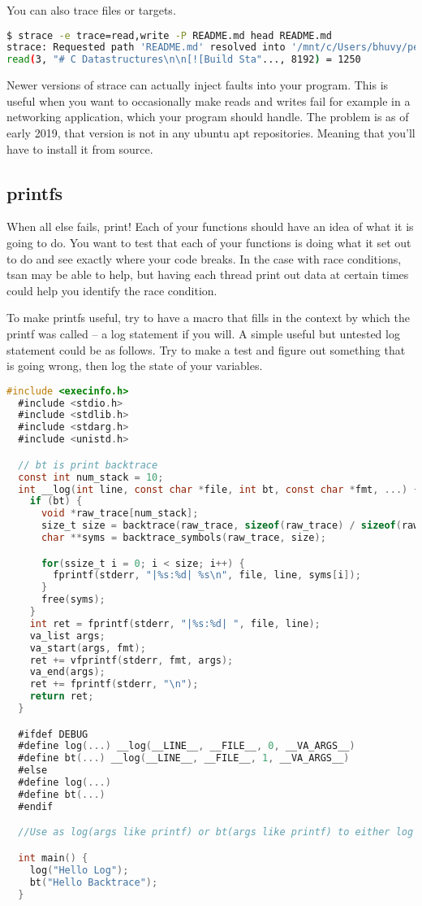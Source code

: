 You can also trace files or targets.

\begin{lstlisting}[language=bash]
$ strace -e trace=read,write -P README.md head README.md
strace: Requested path 'README.md' resolved into '/mnt/c/Users/bhuvy/personal/libds/README.md'
read(3, "# C Datastructures\n\n[![Build Sta"..., 8192) = 1250

\end{lstlisting}

Newer versions of strace can actually inject faults into your program.
This is useful when you want to occasionally make reads and writes fail for example in a networking application, which your program should handle.
The problem is as of early 2019, that version is not in any ubuntu apt repositories.
Meaning that you'll have to install it from source.

\subsection{printfs}

When all else fails, print! Each of your functions should have an idea of what it is going to do.
You want to test that each of your functions is doing what it set out to do and see exactly where your code breaks.
In the case with race conditions, tsan may be able to help, but having each thread print out data at certain times could help you identify the race condition.

To make printfs useful, try to have a macro that fills in the context by which the printf was called -- a log statement if you will. A simple useful but untested log statement could be as follows.
Try to make a test and figure out something that is going wrong, then log the state of your variables.

\begin{lstlisting}[language=C]
  #include <execinfo.h>
  #include <stdio.h>
  #include <stdlib.h>
  #include <stdarg.h>
  #include <unistd.h>

  // bt is print backtrace
  const int num_stack = 10;
  int __log(int line, const char *file, int bt, const char *fmt, ...) {
    if (bt) {
      void *raw_trace[num_stack];
      size_t size = backtrace(raw_trace, sizeof(raw_trace) / sizeof(raw_trace[0]));
      char **syms = backtrace_symbols(raw_trace, size);

      for(ssize_t i = 0; i < size; i++) {
        fprintf(stderr, "|%s:%d| %s\n", file, line, syms[i]);
      }
      free(syms);
    }
    int ret = fprintf(stderr, "|%s:%d| ", file, line);
    va_list args;
    va_start(args, fmt);
    ret += vfprintf(stderr, fmt, args);
    va_end(args);
    ret += fprintf(stderr, "\n");
    return ret;
  }

  #ifdef DEBUG
  #define log(...) __log(__LINE__, __FILE__, 0, __VA_ARGS__)
  #define bt(...) __log(__LINE__, __FILE__, 1, __VA_ARGS__)
  #else
  #define log(...)
  #define bt(...)
  #endif

  //Use as log(args like printf) or bt(args like printf) to either log or get backtrace

  int main() {
    log("Hello Log");
    bt("Hello Backtrace");
  }
\end{lstlisting}


